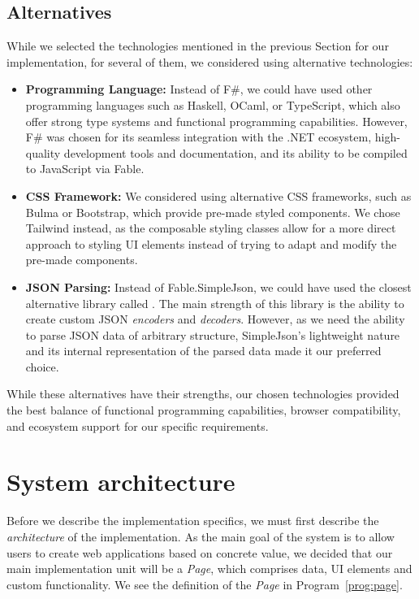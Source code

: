 \subsection{Alternatives}
While we selected the technologies mentioned in the previous Section for our implementation, for several of them, we considered using alternative technologies:
\begin{itemize}
	\item \textbf{Programming Language:} Instead of F\#, we could have used other programming languages such as Haskell, OCaml, or TypeScript, which also offer strong type systems and functional programming capabilities.
	      However, F\# was chosen for its seamless integration with the .NET ecosystem, high-quality development tools and documentation, and its ability to be compiled to JavaScript via Fable.
	\item \textbf{CSS Framework:} We considered using alternative CSS frameworks, such as Bulma or Bootstrap, which provide pre-made styled components.
	      We chose Tailwind instead, as the composable styling classes allow for a more direct approach to styling UI elements instead of trying to adapt and modify the pre-made components.
	\item \textbf{JSON Parsing:} Instead of Fable.SimpleJson, we could have used the closest alternative library called \citet{thoth}.
	      The main strength of this library is the ability to create custom JSON \emph{encoders} and \emph{decoders}.
	      However, as we need the ability to parse JSON data of arbitrary structure, SimpleJson's lightweight nature and its internal representation of the parsed data made it our preferred choice.
\end{itemize}
While these alternatives have their strengths, our chosen technologies provided the best balance of functional programming capabilities, browser compatibility, and ecosystem support for our specific requirements.
\medskip
\section{System architecture}
\label{sec:appArch}
Before we describe the implementation specifics, we must first describe the \emph{architecture} of the implementation.
As the main goal of the system is to allow users to create web applications based on concrete value, we decided that our main implementation unit will be a \emph{Page}, which comprises data, UI elements and custom functionality.
We see the definition of the \emph{Page} in Program~\ref{prog:page}.

